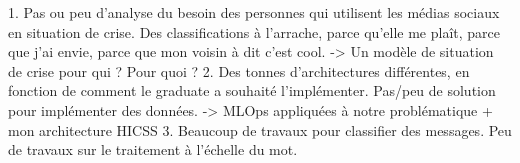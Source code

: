 1. Pas ou peu d'analyse du besoin des personnes qui utilisent les médias sociaux en situation de crise. Des classifications à l'arrache, parce qu'elle me plaît, parce que j'ai envie, parce que mon voisin à dit c'est cool.
-> Un modèle de situation de crise pour qui ? Pour quoi ?
2. Des tonnes d'architectures différentes, en fonction de comment le graduate a souhaité l'implémenter. Pas/peu de solution pour implémenter des données.
-> MLOps appliquées à notre problématique + mon architecture HICSS
3. Beaucoup de travaux pour classifier des messages. Peu de travaux sur le traitement à l'échelle du mot.


